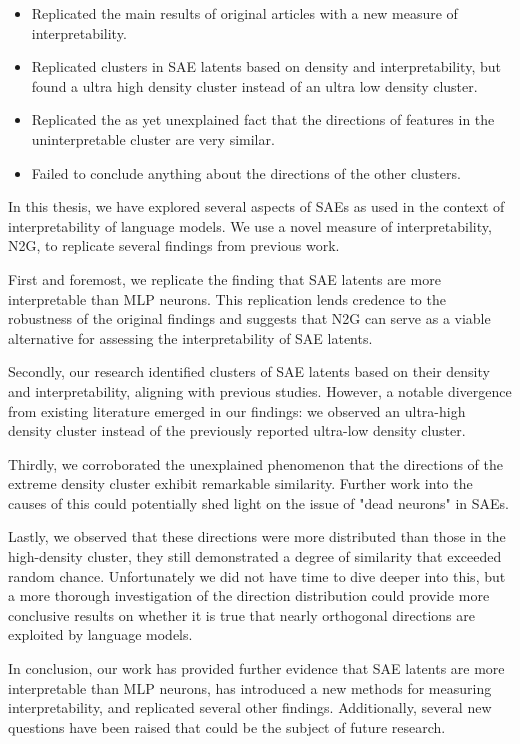 
\begin{itemize}
    \item Replicated the main results of original articles with a new measure of interpretability.
    \item Replicated clusters in SAE latents based on density and interpretability, but found a ultra high density cluster instead of an ultra low density cluster.
    \item Replicated the as yet unexplained fact that the directions of features in the uninterpretable cluster are very similar.
    \item Failed to conclude anything about the directions of the other clusters.
\end{itemize}

In this thesis, we have explored several aspects of SAEs as used in the context of interpretability of language models.
We use a novel measure of interpretability, N2G, to replicate several findings from previous work.

First and foremost, we replicate the finding that SAE latents are more interpretable than MLP neurons.
This replication lends credence to the robustness of the original findings and suggests that N2G can serve as a viable alternative for assessing the interpretability of SAE latents.

Secondly, our research identified clusters of SAE latents based on their density and interpretability, aligning with previous studies.
However, a notable divergence from existing literature emerged in our findings: we observed an ultra-high density cluster instead of the previously reported ultra-low density cluster. 

Thirdly, we corroborated the unexplained phenomenon that the directions of the extreme density cluster exhibit remarkable similarity.
Further work into the causes of this could potentially shed light on the issue of "dead neurons" in SAEs.

Lastly, we observed that these directions were more distributed than those in the high-density cluster, they still demonstrated a degree of similarity that exceeded random chance.
Unfortunately we did not have time to dive deeper into this, but a more thorough investigation of the direction distribution could provide more conclusive results on whether it is true that nearly orthogonal directions are exploited by language models.

In conclusion, our work has provided further evidence that SAE latents are more interpretable than MLP neurons, has introduced a new methods for measuring interpretability, and replicated several other findings.
Additionally, several new questions have been raised that could be the subject of future research.



